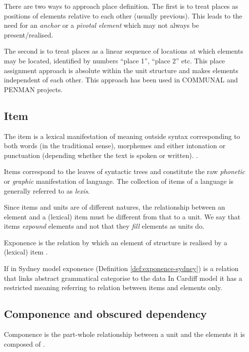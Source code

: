 There are two ways to approach place definition. The first is to treat places as positions of elements relative to each other (usually previous). This leads to the need for an \textit{anchor} or a \textit{pivotal element} which may not always be present/realised.

The second is to treat places as a linear sequence of locations at which elements may be located, identified by numbers ``place 1'', ``place 2'' etc. This place assignment approach is absolute within the unit structure and makes elements independent of each other. This approach has been used in COMMUNAL \citep{Fawcett90-communal} and PENMAN \citep{PenmanOverview} projects. 

\subsection{Item}
\begin{definition}[Item]\label{def:item}
	The item is a lexical manifestation of meaning outside syntax corresponding to both words (in the traditional sense), morphemes and either intonation or punctuation (depending whether the text is spoken or written). \citep[226--232]{Fawcett2000}. 
\end{definition}

Items correspond to the leaves of syntactic trees and constitute the raw \textit{phonetic} or \textit{graphic} manifestation of language. The collection of items of a language is generally referred to as \textit{lexis}.

Since items and units are of different natures, the relationship between an element and a (lexical) item must be different from that to a unit. We say that items \textit{expound} elements and not that they \textit{fill} elements as units do. 

\begin{definition}\label{def:exponence}
    Exponence is the relation by which an element of structure is realised by a (lexical) item \citep[254]{Fawcett2000}. 
\end{definition}

If in Sydney model exponence (Definition \ref{def:exponence-sydney}) is a relation that links abstract grammatical categorise to the data In Cardiff model it has a restricted meaning referring to relation between items and elements only. 

\subsection{Componence and obscured dependency}
\label{sec:componence}
\begin{definition}[Componence]\label{def:componence}
    Componence is the part-whole relationship between a unit and the elements it is composed of \citep[244]{Fawcett2000}. 
\end{definition}

